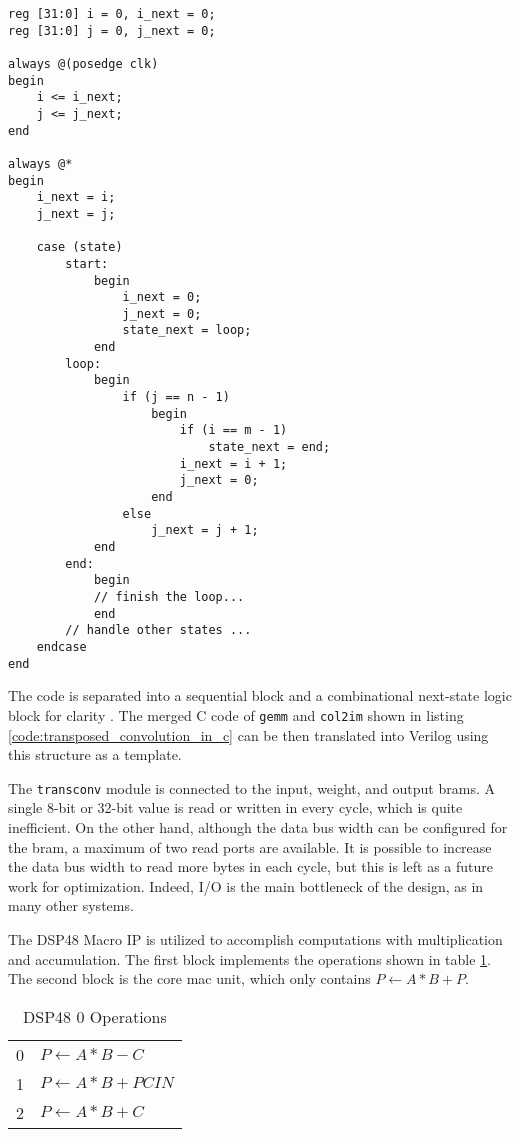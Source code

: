 \begin{code}
\begin{verbatim}
reg [31:0] i = 0, i_next = 0;
reg [31:0] j = 0, j_next = 0;

always @(posedge clk)
begin
    i <= i_next;
    j <= j_next;
end

always @*
begin
    i_next = i;
    j_next = j;

    case (state)
        start:
            begin
                i_next = 0;
                j_next = 0;
                state_next = loop;
            end
        loop:
            begin
                if (j == n - 1)
                    begin
                        if (i == m - 1)
                            state_next = end;
                        i_next = i + 1;
                        j_next = 0;
                    end
                else
                    j_next = j + 1;
            end
        end:
            begin
            // finish the loop...
            end
        // handle other states ...
    endcase
end
\end{verbatim}
\label{code:simple_for_verilog}
\end{code}

The code is separated into a sequential block and a combinational next-state logic block for clarity
\cite{Chu-Verilog}.
The merged C code of \texttt{gemm} and \texttt{col2im} shown in listing
\ref{code:transposed_convolution_in_c} can be then translated into Verilog using this structure
as a template.

The \texttt{transconv} module is connected to the input, weight, and output \glspl{bram}. A single
8-bit or 32-bit value is read or written in every cycle, which is quite inefficient. On the other hand,
although the data bus width can be configured for the \gls{bram}, a maximum of two read ports are available.
It is possible to increase the data bus width to read more bytes in each cycle, but this is left
as a future work for optimization. Indeed, I/O is the main bottleneck of the design, as in many other systems.

The DSP48 Macro IP is utilized to accomplish computations with multiplication and accumulation. The first
block implements the operations shown in table \ref{table:dsp48_0_operations}. The second block is the core
\gls{mac} unit, which only contains $P \leftarrow A*B+P$.

\begin{table}[h]
  \centering
  \caption{DSP48 0 Operations}
  \begin{tabular}{l | l}
    0 & $P \leftarrow A*B-C$ \\
    1 & $P \leftarrow A*B+PCIN$ \\
    2 & $P \leftarrow A*B+C$
  \end{tabular}
  \label{table:dsp48_0_operations}
\end{table}

